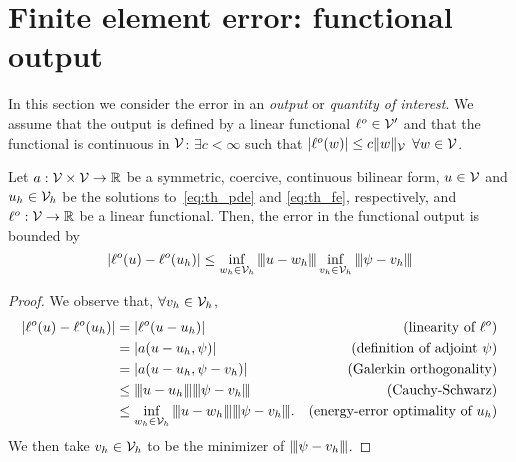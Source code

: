 \section{Finite element error: functional output}
In this section we consider the error in an \emph{output} or \emph{quantity of interest}.  We assume that the output is defined by a linear functional $\ell^o \in \mathcal{V}'$ and that the functional is continuous in $\mathcal{V}$: $\exists c < \infty$ such that $|\ell^o(w)| \leq c \| w \|_{\mathcal{V}}$ $\forall w \in \mathcal{V}$. 
\begin{proposition}
  \label{prop:th_output_sym}
  Let $a: \mathcal{V} \times \mathcal{V} \to \mathbb{R}$ be a symmetric, coercive, continuous bilinear form, $u \in \mathcal{V}$ and $u_h \in \mathcal{V}_h$ be the solutions to~\eqref{eq:th_pde} and \eqref{eq:th_fe}, respectively, and $\ell^o: \mathcal{V} \to \mathbb{R}$ be a linear functional. Then, the error in the functional output is bounded by 
\begin{equation*}
  |\ell^o(u) - \ell^o(u_h)| \leq
  \inf_{w_h \in \mathcal{V}_h} |\kern-1pt|\kern-1pt| u - w_h |\kern-1pt|\kern-1pt| \inf_{v_h \in \mathcal{V}_h} |\kern-1pt|\kern-1pt| \psi - v_h |\kern-1pt|\kern-1pt|
\end{equation*}
\begin{proof}
  We observe that, $\forall v_h \in \mathcal{V}_h$, 
\begin{align*}
  |\ell^o(u) - \ell^o(u_h)|
  &= |\ell^o(u - u_h)| & \text{(linearity of $\ell^o$)} \\
  &= |a(u-u_h,\psi)| & \text{(definition of adjoint $\psi$)} \\
  &= |a(u-u_h,\psi-v_h)| & \text{(Galerkin orthogonality)} \\
  &\leq |\kern-1pt|\kern-1pt|  u - u_h  |\kern-1pt|\kern-1pt||\kern-1pt|\kern-1pt|  \psi - v_h  |\kern-1pt|\kern-1pt| & \text{(Cauchy-Schwarz)} \\
  &\leq \inf_{w_h \in \mathcal{V}_h} |\kern-1pt|\kern-1pt|  u - w_h  |\kern-1pt|\kern-1pt||\kern-1pt|\kern-1pt|  \psi - v_h  |\kern-1pt|\kern-1pt|. & \text{(energy-error optimality of $u_h$)}
\end{align*}
We then take $v_h \in \mathcal{V}_h$ to be the minimizer of $|\kern-1pt|\kern-1pt| \psi - v_h |\kern-1pt|\kern-1pt|$.
\end{proof}
\end{proposition}

